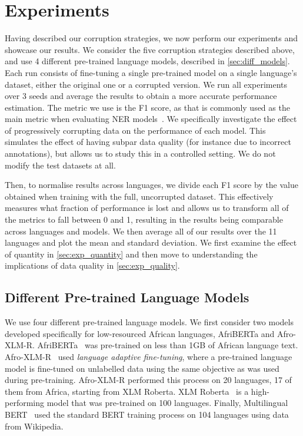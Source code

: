 \documentclass{article}
\newcommand{\afriberta}{AfriBERTa\xspace}
\newcommand{\afroxlmr}{Afro-XLM-R\xspace}
\begin{document}
\section{Experiments}
Having described our corruption strategies, we now perform our experiments and showcase our results. We consider the five corruption strategies described above, and use 4 different pre-trained language models, described in \autoref{sec:diff_models}. Each run consists of fine-tuning a single pre-trained model on a single language's dataset, either the original one or a corrupted version.
We run all experiments over 3 seeds and average the results to obtain a more accurate performance estimation. The metric we use is the F1 score, as that is commonly used as the main metric when evaluating NER models~\citep{sang2003introduction_conll,adelani2021MasakhaNER}.
We specifically investigate the effect of progressively corrupting data on the performance of each model. This simulates the effect of having subpar data quality (for instance due to incorrect annotations), but allows us to study this in a controlled setting. We do not modify the test datasets at all.

Then, to normalise results across languages, we divide each F1 score by the value obtained when training with the full, uncorrupted dataset. This effectively measures what fraction of performance is lost and allows us to transform all of the metrics to fall between 0 and 1, resulting in the results being comparable across languages and models. We then average all of our results over the 11 languages and plot the mean and standard deviation. We first examine the effect of quantity in \autoref{sec:exp_quantity} and then move to understanding the implications of data quality in \autoref{sec:exp_quality}.

\subsection{Different Pre-trained Language Models}
\label{sec:diff_models}
We use four different pre-trained language models. We first consider two models developed specifically for low-resourced African languages, \afriberta and \afroxlmr. \afriberta~\citep{ogueji2021Small} was pre-trained on less than 1GB of African language text. \afroxlmr~\citep{alabi2022Multilingual} used \textit{language adaptive fine-tuning}, where a pre-trained language model is fine-tuned on unlabelled data using the same objective as was used during pre-training. \afroxlmr performed this process on 20 languages, 17 of them from Africa, starting from XLM Roberta. XLM Roberta~\citep{conneau2019Unsupervised} is a high-performing model that was pre-trained on 100 languages. Finally, Multilingual BERT~\citep{devlin2019BERT} used the standard BERT training process on 104 languages using data from Wikipedia.
\end{document}
